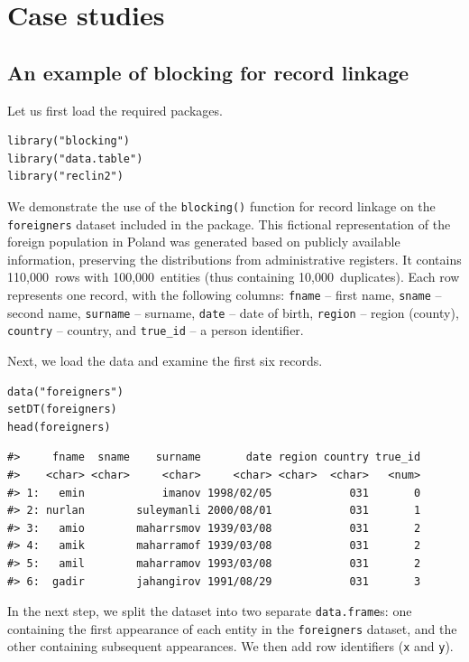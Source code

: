 \section{Case studies}\label{sec-case}

\subsection{An example of blocking for record linkage}\label{an-example-of-blocking-for-record-linkage}

Let us first load the required packages.

\begin{verbatim}
library("blocking")
library("data.table")
library("reclin2")
\end{verbatim}

We demonstrate the use of the \texttt{blocking()} function for record linkage
on the \texttt{foreigners} dataset included in the package. This fictional
representation of the foreign population in Poland was generated based
on publicly available information, preserving the distributions from
administrative registers. It contains 110,000~rows with 100,000~entities
(thus containing 10,000~duplicates). Each row represents one record,
with the following columns: \texttt{fname} -- first name, \texttt{sname} -- second
name, \texttt{surname} -- surname, \texttt{date} -- date of birth, \texttt{region} -- region
(county), \texttt{country} -- country, and \texttt{true\_id} -- a person identifier.

Next, we load the data and examine the first six records.

\begin{verbatim}
data("foreigners")
setDT(foreigners)
head(foreigners)
\end{verbatim}

\begin{verbatim}
#>     fname  sname    surname       date region country true_id
#>    <char> <char>     <char>     <char> <char>  <char>   <num>
#> 1:   emin            imanov 1998/02/05            031       0
#> 2: nurlan        suleymanli 2000/08/01            031       1
#> 3:   amio        maharrsmov 1939/03/08            031       2
#> 4:   amik        maharramof 1939/03/08            031       2
#> 5:   amil        maharramov 1993/03/08            031       2
#> 6:  gadir        jahangirov 1991/08/29            031       3
\end{verbatim}

In the next step, we split the dataset into two separate \texttt{data.frame}s:
one containing the first appearance of each entity in the \texttt{foreigners}
dataset, and the other containing subsequent appearances. We then add
row identifiers (\texttt{x} and \texttt{y}).

